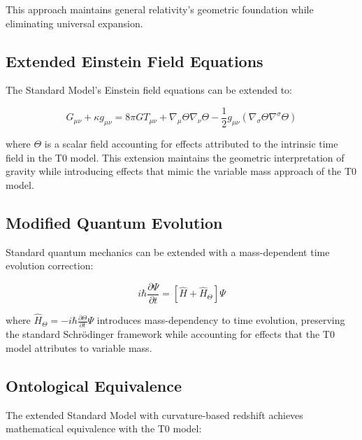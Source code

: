\documentclass[aps,prl,twocolumn,superscriptaddress,nofootinbib]{revtex4-2}
\begin{document}
	This approach maintains general relativity's geometric foundation while eliminating universal expansion.
	
	\subsection{Extended Einstein Field Equations}
	\label{subsec:extended_einstein}
	
	The Standard Model's Einstein field equations can be extended to:
	
	\begin{equation}
		G_{\mu\nu} + \kappa g_{\mu\nu} = 8\pi G T_{\mu\nu} + \nabla_{\mu}\Theta\nabla_{\nu}\Theta - \frac{1}{2}g_{\mu\nu}(\nabla_{\sigma}\Theta\nabla^{\sigma}\Theta)
		\label{eq:extended_einstein}
	\end{equation}
	
	where $\Theta$ is a scalar field accounting for effects attributed to the intrinsic time field in the T0 model. This extension maintains the geometric interpretation of gravity while introducing effects that mimic the variable mass approach of the T0 model.
	
	\subsection{Modified Quantum Evolution}
	\label{subsec:quantum_evolution}
	
	Standard quantum mechanics can be extended with a mass-dependent time evolution correction:
	
	\begin{equation}
		i\hbar\frac{\partial\Psi}{\partial t} = [\hat{H} + \hat{H}_{\Theta}]\Psi
		\label{eq:extended_schrodinger}
	\end{equation}
	
	where $\hat{H}_{\Theta} = -i\hbar\frac{\partial\Theta}{\partial t}\Psi$ introduces mass-dependency to time evolution, preserving the standard Schrödinger framework while accounting for effects that the T0 model attributes to variable mass.
	
	\subsection{Ontological Equivalence}
	\label{subsec:model_equivalence}
	
	The extended Standard Model with curvature-based redshift achieves mathematical equivalence with the T0 model:
	
\end{document}
